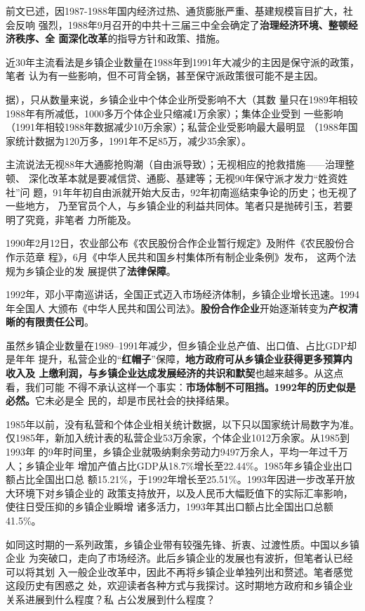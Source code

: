 前文已述，因1987-1988年国内经济过热、通货膨胀严重、基建规模盲目扩大，社会反响
强烈，1988年9月召开的中共十三届三中全会确定了\textbf{治理经济环境、整顿经济秩序、全
  面深化改革}的指导方针和政策、措施。


近30年主流看法是乡镇企业数量在1988年到1991年大减少的主因是保守派的政策，笔者
认为有一些影响，但不可背全锅，甚至保守派政策很可能不是主因。

据），只从数量来说，乡镇企业中个体企业所受影响不大（其数
量只在1989年相较1988年有所减低，1000多万个体企业只缩减1万余家）；集体企业受到
一些影响（1991年相较1988年数据减少10万余家）；私营企业受影响最大最明显
（1988年国家统计数据为120万多，1991年不足85万，减少35余家）。

主流说法无视88年大通膨抢购潮（自由派导致）；无视相应的抢救措施——治理整顿、
深化改革本就是要减信贷、通膨、基建等；无视90年保守派才发力“姓资姓社”问
题，91年年初自由派就开始大反击，92年初南巡结束争论的历史；也无视了一些地方，
乃至官员个人，与乡镇企业的利益共同体。笔者只是抛砖引玉，若要明了究竟，非笔者
力所能及。



1990年2月12日，农业部公布《农民股份合作企业暂行规定》及附件《农民股份合作示范章
程》，6月《中华人民共和国乡村集体所有制企业条例》发布， 这两个法规为乡镇企业的发
展提供了\textbf{法律保障}。


1992年，邓小平南巡讲话，全国正式迈入市场经济体制，乡镇企业增长迅速。1994年全国人
大颁布《中华人民共和国公司法》。\textbf{股份合作企业}开始逐渐转变为\textbf{产权清
  晰的有限责任公司}。

虽然乡镇企业数量在1989--1991年减少，但乡镇企业总产值、出口值、占比GDP却是年年
提升，私营企业的“\textbf{红帽子}”保障，\textbf{地方政府可从乡镇企业获得更多预算内收入及
  上缴利润，与乡镇企业达成发展经济的共识和默契}也越来越多。从这点看，我们可能
不得不承认这样一个事实：\textbf{市场体制不可阻挡。1992年的历史似是必然。}它未必是全
民的，却是市民社会的抉择结果。

1985年以前，没有私营和个体企业相关统计数据，以下只以国家统计局数字为准。
仅1985年，新加入统计表的私营企业53万余家，个体企业1012万余家。从1985到1993年
的9年时间里，乡镇企业就吸纳剩余劳动力9497万余人，平均一年过千万人；乡镇企业年
增加产值占比GDP从18.7\%增长至22.44\%。1985年乡镇企业出口额占比全国出口总
额15.21\%，于1992年增长至25.51\%。1993年因进一步改革开放大环境下对乡镇企业的
政策支持放开，以及人民币大幅贬值下的实际汇率影响，使往日受压抑的乡镇企业瞬增
诸多活力，1993年其出口额占比全国出口总额41.5\%。

如同这时期的一系列政策，乡镇企业带有较强先锋、折衷、过渡性质。中国以乡镇企业
为突破口，走向了市场经济。此后乡镇企业的发展也有波折，但笔者认已经可以将其划
入一般企业改革中，因此不再将乡镇企业单独列出和赘述。笔者感觉这段历史有困惑之
处，欢迎读者各种方式与我探讨。这时期地方政府和乡镇企业关系进展到什么程度？私
占公发展到什么程度？

